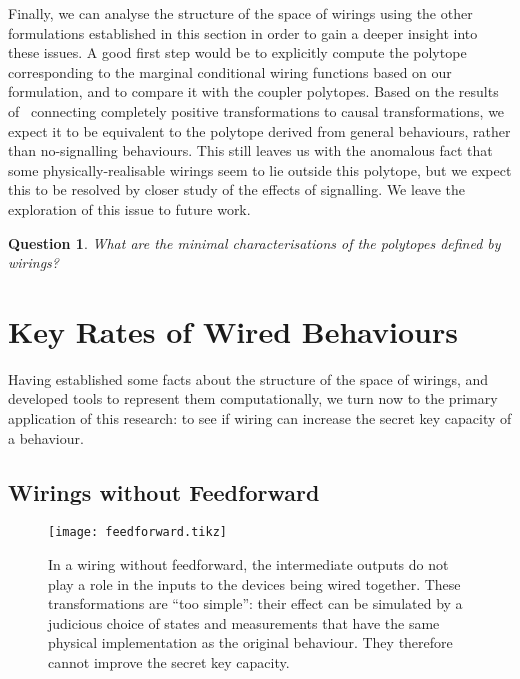 \documentclass[10pt, a4paper]{article}
\numberwithin{equation}{section} %
\theoremstyle{definition}
\theoremstyle{plain}
\newtheorem{question}{Question}
\newcommand{\?}{\mathrel{?}} %
\begin{document}
                  Finally, we can analyse the structure of the space of wirings using the other formulations established in this section in order to gain a deeper insight into these issues. A good first step would be to explicitly compute the polytope corresponding to the marginal conditional wiring functions based on our formulation, and to compare it with the coupler polytopes. Based on the results of~\cite{LocalTransformations} connecting completely positive transformations to causal transformations, we expect it to be equivalent to the polytope derived from general behaviours, rather than no-signalling behaviours. This still leaves us with the anomalous fact that some physically-realisable wirings seem to lie outside this polytope, but we expect this to be resolved by closer study of the effects of signalling. We leave the exploration of this issue to future work.
                  \begin{question}
                    What are the minimal characterisations of the polytopes defined by wirings?
                  \end{question}

                  \section{Key Rates of Wired Behaviours}\label{sec:krwir}

                  Having established some facts about the structure of the space of wirings, and developed tools to represent them computationally, we turn now to the primary application of this research: to see if wiring can increase the secret key capacity of a behaviour.

                  \subsection{Wirings without Feedforward}\label{sec:krwir_feedforward}


              \begin{figure}
                \centering
                \texttt{[image: feedforward.tikz]}
                \caption[Causal influences in a wiring without feedforward between two iid quantum behaviours.]{\label{fig:feedforward} In a wiring without feedforward, the intermediate outputs do not play a role in the inputs to the devices being wired together. These transformations are ``too simple'': their effect can be simulated by a judicious choice of states and measurements that have the same physical implementation as the original behaviour. They therefore cannot improve the secret key capacity.}
              \end{figure}
\end{document}
